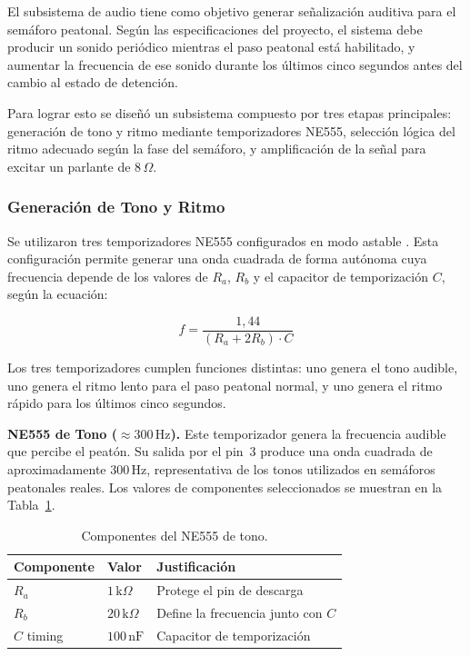 \documentclass[12pt,onecolumn]{IEEEtran}
\begin{document}
El subsistema de audio tiene como objetivo generar señalización auditiva para el semáforo peatonal. Según las especificaciones del proyecto, el sistema debe producir un sonido periódico mientras el paso peatonal está habilitado, y aumentar la frecuencia de ese sonido durante los últimos cinco segundos antes del cambio al estado de detención.

Para lograr esto se diseñó un subsistema compuesto por tres etapas principales: generación de tono y ritmo mediante temporizadores NE555, selección lógica del ritmo adecuado según la fase del semáforo, y amplificación de la señal para excitar un parlante de $8\,\Omega$.

\subsubsection{Generación de Tono y Ritmo}

Se utilizaron tres temporizadores NE555 configurados en modo astable \cite{ne555art}. Esta configuración permite generar una onda cuadrada de forma autónoma cuya frecuencia depende de los valores de $R_a$, $R_b$ y el capacitor de temporización $C$, según la ecuación:

\begin{equation}
    f = \frac{1{,}44}{(R_a + 2R_b)\cdot C}
    \label{eq:555audio}
\end{equation}

Los tres temporizadores cumplen funciones distintas: uno genera el tono audible, uno genera el ritmo lento para el paso peatonal normal, y uno genera el ritmo rápido para los últimos cinco segundos.

\textbf{NE555 de Tono ($\approx 300\,\text{Hz}$).}
Este temporizador genera la frecuencia audible que percibe el peatón. Su salida por el pin~3 produce una onda cuadrada de aproximadamente $300\,\text{Hz}$, representativa de los tonos utilizados en semáforos peatonales reales. Los valores de componentes seleccionados se muestran en la Tabla~\ref{tab:555tono}.

\begin{table}[H]
\centering
\caption{Componentes del NE555 de tono.}
\label{tab:555tono}
\begin{tabular}{lll}
\toprule
\textbf{Componente} & \textbf{Valor} & \textbf{Justificación} \\
\midrule
$R_a$       & $1\,\text{k}\Omega$   & Protege el pin de descarga \\
$R_b$       & $20\,\text{k}\Omega$  & Define la frecuencia junto con $C$ \\
$C$ timing  & $100\,\text{nF}$      & Capacitor de temporización \\
\bottomrule
\end{tabular}
\end{table}
\end{document}
